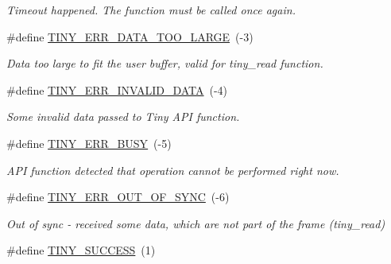 \begin{DoxyCompactItemize}
\begin{DoxyCompactList}\small\item\em Timeout happened. The function must be called once again. \end{DoxyCompactList}\item 
\hypertarget{group__ERROR__FLAGS_ga7bbe7440d11ad304b0af68e011f4eab7}{}\#define \hyperlink{group__ERROR__FLAGS_ga7bbe7440d11ad304b0af68e011f4eab7}{T\+I\+N\+Y\+\_\+\+E\+R\+R\+\_\+\+D\+A\+T\+A\+\_\+\+T\+O\+O\+\_\+\+L\+A\+R\+G\+E}~(-\/3)\label{group__ERROR__FLAGS_ga7bbe7440d11ad304b0af68e011f4eab7}

\begin{DoxyCompactList}\small\item\em Data too large to fit the user buffer, valid for tiny\+\_\+read function. \end{DoxyCompactList}\item 
\hypertarget{group__ERROR__FLAGS_ga541a9e67a84e39595ad647d641c4df2e}{}\#define \hyperlink{group__ERROR__FLAGS_ga541a9e67a84e39595ad647d641c4df2e}{T\+I\+N\+Y\+\_\+\+E\+R\+R\+\_\+\+I\+N\+V\+A\+L\+I\+D\+\_\+\+D\+A\+T\+A}~(-\/4)\label{group__ERROR__FLAGS_ga541a9e67a84e39595ad647d641c4df2e}

\begin{DoxyCompactList}\small\item\em Some invalid data passed to Tiny A\+P\+I function. \end{DoxyCompactList}\item 
\hypertarget{group__ERROR__FLAGS_ga9b3e170e1c6ce269f216ef4a1ac61995}{}\#define \hyperlink{group__ERROR__FLAGS_ga9b3e170e1c6ce269f216ef4a1ac61995}{T\+I\+N\+Y\+\_\+\+E\+R\+R\+\_\+\+B\+U\+S\+Y}~(-\/5)\label{group__ERROR__FLAGS_ga9b3e170e1c6ce269f216ef4a1ac61995}

\begin{DoxyCompactList}\small\item\em A\+P\+I function detected that operation cannot be performed right now. \end{DoxyCompactList}\item 
\hypertarget{group__ERROR__FLAGS_gae1949de45d9c478830dad9c9b996193a}{}\#define \hyperlink{group__ERROR__FLAGS_gae1949de45d9c478830dad9c9b996193a}{T\+I\+N\+Y\+\_\+\+E\+R\+R\+\_\+\+O\+U\+T\+\_\+\+O\+F\+\_\+\+S\+Y\+N\+C}~(-\/6)\label{group__ERROR__FLAGS_gae1949de45d9c478830dad9c9b996193a}

\begin{DoxyCompactList}\small\item\em Out of sync -\/ received some data, which are not part of the frame (tiny\+\_\+read) \end{DoxyCompactList}\item 
\hypertarget{group__ERROR__FLAGS_ga16cd043c890ed1fa381b3a20f75a626c}{}\#define \hyperlink{group__ERROR__FLAGS_ga16cd043c890ed1fa381b3a20f75a626c}{T\+I\+N\+Y\+\_\+\+S\+U\+C\+C\+E\+S\+S}~(1)\label{group__ERROR__FLAGS_ga16cd043c890ed1fa381b3a20f75a626c}


\end{DoxyCompactItemize}
